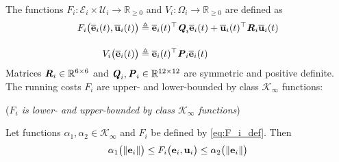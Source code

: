 


The functions
$F_i : \mathcal{E}_i \times \mathcal{U}_i \to \mathbb{R}_{\geq 0}$ and
$V_i: \Omega_i \to \mathbb{R}_{\geq 0}$ are defined as
\begin{align}
  F_i \big(\overline{\bm{\mathbf{e}}}_i(t), \overline{\bm{\mathbf{u}}}_i(t)\big)
    &\triangleq \overline{\bm{\mathbf{e}}}_i(t)^{\top} \bm{\mathit{Q}}_i \overline{\bm{\mathbf{e}}}_i(t)
  + \overline{\bm{\mathbf{u}}}_i(t)^{\top} \bm{\mathit{R}}_i \overline{\bm{\mathbf{u}}}_i(t) \label{eq:F_i_def} \\[2.5ex]
  V_i \big(\overline{\bm{\mathbf{e}}}_i(t)\big) & \triangleq \overline{\bm{\mathbf{e}}}_i(t)^{\top} \bm{\mathit{P}}_i \overline{\bm{\mathbf{e}}}_i(t) \label{eq:V_i_def}
\end{align}
Matrices $\bm{\mathit{R}}_i \in \mathbb{R}^{6 \times 6}$ and
$\bm{\mathit{Q}}_i, \bm{\mathit{P}}_i \in \mathbb{R}^{12 \times 12}$ are symmetric and positive
definite.  The running costs $F_i$ are upper- and lower-bounded by class
$\mathcal{K}_{\infty}$ functions:

\begin{bw_box}
  \begin{lemma} (\textit{$F_i$ is lower- and upper-bounded by class $\mathcal{K}_{\infty}$ functions})
    \label{lemma:F_i_bounded_K_class}

    Let functions $\alpha_1, \alpha_2 \in \mathcal{K}_{\infty}$ and $F_i$
    be defined by \eqref{eq:F_i_def}. Then
    \begin{align}
      \alpha_1\big(\|\bm{\mathbf{e}}_i\|\big) \leq F_i\big(\bm{\mathbf{e}}_i, \bm{\mathbf{u}}_i\big) \leq \alpha_2\big(\| \bm{\mathbf{e}}_i \|\big)
    \end{align}
  \end{lemma}
\end{bw_box}

